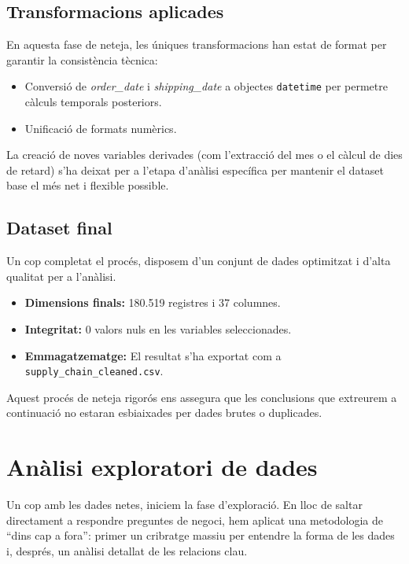 \documentclass[12pt,a4paper]{article}
\begin{document}
\subsection{Transformacions aplicades}
En aquesta fase de neteja, les úniques transformacions han estat de format per garantir la consistència tècnica:
\begin{itemize}
    \item Conversió de \textit{order\_date} i \textit{shipping\_date} a objectes \texttt{datetime} per permetre càlculs temporals posteriors.
    \item Unificació de formats numèrics.
\end{itemize}
La creació de noves variables derivades (com l'extracció del mes o el càlcul de dies de retard) s'ha deixat per a l'etapa d'anàlisi específica per mantenir el dataset base el més net i flexible possible.
\subsection{Dataset final}
Un cop completat el procés, disposem d'un conjunt de dades optimitzat i d'alta qualitat per a l'anàlisi.

\begin{itemize}
    \item \textbf{Dimensions finals:} 180.519 registres i 37 columnes.
    \item \textbf{Integritat:} 0 valors nuls en les variables seleccionades.
    \item \textbf{Emmagatzematge:} El resultat s'ha exportat com a \texttt{supply\_chain\_cleaned.csv}.
\end{itemize}

Aquest procés de neteja rigorós ens assegura que les conclusions que extreurem a continuació no estaran esbiaixades per dades brutes o duplicades.
\section{Anàlisi exploratori de dades}

Un cop amb les dades netes, iniciem la fase d'exploració. En lloc de saltar directament a respondre preguntes de negoci, hem aplicat una metodologia de ``dins cap a fora'': primer un cribratge massiu per entendre la forma de les dades i, després, un anàlisi detallat de les relacions clau.
\end{document}
